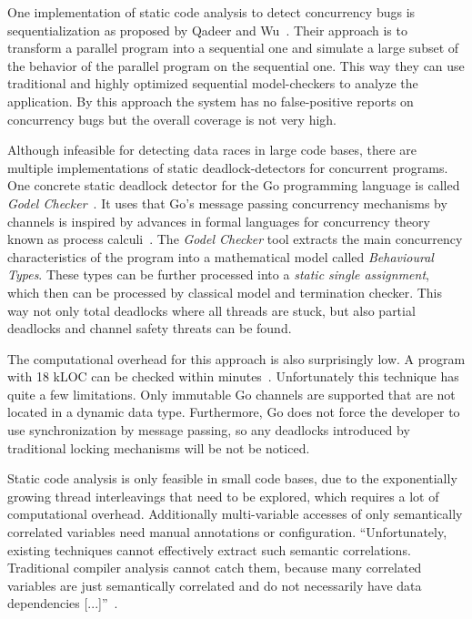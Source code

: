 \documentclass[conference]{IEEEtran}
\begin{document}
One implementation of static code analysis to detect concurrency bugs is sequentialization as proposed by Qadeer and Wu~\cite{qadeer2004kiss}.
Their approach is to transform a parallel program into a sequential one and simulate a large subset of the behavior of the parallel program on the sequential one.
This way they can use traditional and highly optimized sequential model-checkers to analyze the application.
By this approach the system has no false-positive reports on concurrency bugs but the overall coverage is not very high.

Although infeasible for detecting data races in large code bases, there are multiple implementations of static deadlock-detectors for concurrent programs.
One concrete static deadlock detector for the Go programming language is called \emph{Godel Checker}~\cite{godelChecker}.
It uses that Go's message passing concurrency mechanisms by channels is inspired by advances in formal languages for concurrency theory known as process calculi~\cite{lange2018verification}.
The \emph{Godel Checker} tool extracts the main concurrency characteristics of the program into a mathematical model called \emph{Behavioural Types}.
These types can be further processed into a \emph{static single assignment}, which then can be processed by classical model and termination checker.
This way not only total deadlocks where all threads are stuck, but also partial deadlocks and channel safety threats can be found.

The computational overhead for this approach is also surprisingly low.
A program with 18 kLOC can be checked within minutes~\cite{lange2018verification}.
Unfortunately this technique has quite a few limitations.
Only immutable Go channels are supported that are not located in a dynamic data type.
Furthermore, Go does not force the developer to use synchronization by message passing, so any deadlocks introduced by traditional locking mechanisms will be not be noticed.

Static code analysis is only feasible in small code bases, due to the exponentially growing thread interleavings that need to be explored, which requires a lot of computational overhead.
Additionally multi-variable accesses of only semantically correlated variables need manual annotations or configuration.
``Unfortunately, existing techniques cannot effectively extract such semantic correlations. Traditional compiler analysis cannot catch them, because many correlated variables are just semantically correlated and do not necessarily have data dependencies [...]''~\cite{lu2007muvi}.
\end{document}
